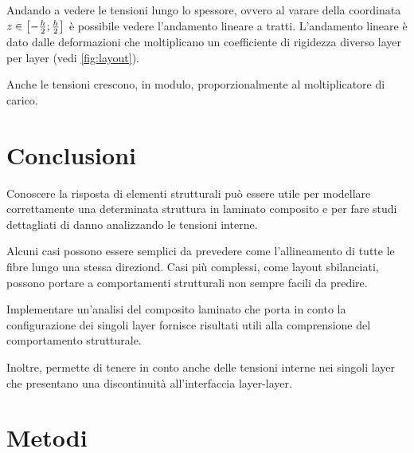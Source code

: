 \documentclass[a4paper,num-refs]{oup-contemporary}
\begin{document}
Andando a vedere le tensioni lungo lo spessore, ovvero al varare della coordinata $z \in \left[-{h\over 2};{h\over 2}\right]$ è possibile vedere l'andamento lineare a tratti. L'andamento lineare è dato dalle deformazioni che moltiplicano un coefficiente di rigidezza diverso layer per layer (vedi \cref{fig:layout}). 

Anche le tensioni crescono, in modulo, proporzionalmente al moltiplicatore di carico. 





\section{Conclusioni}

Conoscere la risposta di elementi strutturali può essere utile per modellare correttamente una determinata struttura in laminato composito e per fare studi dettagliati di danno analizzando le tensioni interne.

Alcuni casi possono essere semplici da prevedere come l'allineamento di tutte le fibre lungo una stessa direziond. Casi più complessi, come layout sbilanciati, possono portare a comportamenti strutturali non sempre facili da predire. 

Implementare un'analisi del composito laminato che porta in conto la configurazione dei singoli layer fornisce risultati utili alla comprensione del comportamento strutturale.

Inoltre, permette di tenere in conto anche delle tensioni interne nei singoli layer che presentano una discontinuità all'interfaccia layer-layer. 

\section{Metodi}
\end{document}
